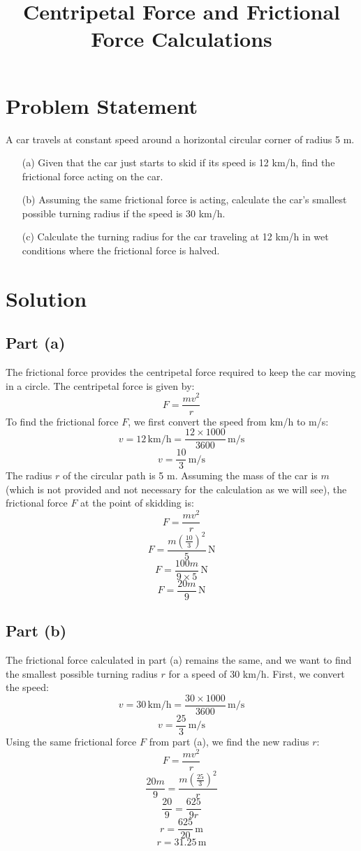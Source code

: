 \documentclass{article}
\begin{document}
\title{Centripetal Force and Frictional Force Calculations}
\date{}
\maketitle

\section*{Problem Statement}
A car travels at constant speed around a horizontal circular corner of radius 5 m.
\begin{enumerate}
    \item[(a)] Given that the car just starts to skid if its speed is 12 km/h, find the frictional force acting on the car.
    \item[(b)] Assuming the same frictional force is acting, calculate the car's smallest possible turning radius if the speed is 30 km/h.
    \item[(c)] Calculate the turning radius for the car traveling at 12 km/h in wet conditions where the frictional force is halved.
\end{enumerate}

\section*{Solution}
\subsection*{Part (a)}
The frictional force provides the centripetal force required to keep the car moving in a circle. The centripetal force is given by:
\[ F = \frac{mv^2}{r} \]
To find the frictional force \( F \), we first convert the speed from km/h to m/s:
\[ v = 12 \, \text{km/h} = \frac{12 \times 1000}{3600} \, \text{m/s} \]
\[ v = \frac{10}{3} \, \text{m/s} \]
The radius \( r \) of the circular path is 5 m. Assuming the mass of the car is \( m \) (which is not provided and not necessary for the calculation as we will see), the frictional force \( F \) at the point of skidding is:
\[ F = \frac{mv^2}{r} \]
\[ F = \frac{m\left(\frac{10}{3}\right)^2}{5} \, \text{N} \]
\[ F = \frac{100m}{9 \times 5} \, \text{N} \]
\[ F = \frac{20m}{9} \, \text{N} \]

\subsection*{Part (b)}
The frictional force calculated in part (a) remains the same, and we want to find the smallest possible turning radius \( r \) for a speed of 30 km/h. First, we convert the speed:
\[ v = 30 \, \text{km/h} = \frac{30 \times 1000}{3600} \, \text{m/s} \]
\[ v = \frac{25}{3} \, \text{m/s} \]
Using the same frictional force \( F \) from part (a), we find the new radius \( r \):
\[ F = \frac{mv^2}{r} \]
\[ \frac{20m}{9} = \frac{m\left(\frac{25}{3}\right)^2}{r} \]
\[ \frac{20}{9} = \frac{625}{9r} \]
\[ r = \frac{625}{20} \, \text{m} \]
\[ r = 31.25 \, \text{m} \]
\end{document}
